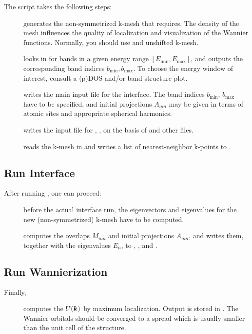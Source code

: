 The script \initwiiw takes the following steps:
%
\begin{description}
\item[] generates the non-symmetrized k-mesh that
  \wannier requires.  The density of the mesh influences the quality
  of localization and visualization of the Wannier functions.
  Normally, you should use and unshifted k-mesh.
\item[] looks in  for bands in a
  given energy range $[E_\text{min}, E_\text{max}]$, and outputs the
  corresponding band indices $b_\text{min}, b_\text{max}$.  To choose
  the energy window of interest, consult a (p)DOS and/or band
  structure plot.
\item[\writeinwf] writes the main input file  for the
  interface.  The band indices $b_\text{min}$, $b_\text{max}$ have to
  be specified, and initial projections $A_{mn}$ may be given in terms
  of atomic sites and appropriate spherical harmonics.
\item[\writewin] writes the input file for \wannierx, ,
  on the basis of  and other files.
\item[] reads the k-mesh in  and
  writes a list of nearest-neighbor k-points to .
\end{description}


\subsection{Run Interface}
After running \initwiiw, one can proceed:
\begin{description}
\item[] before the actual interface run, the
  eigenvectors and eigenvalues for the new (non-symmetrized) k-mesh
  have to be computed.
\item[] computes the overlaps $M_{mn}$ and initial
  projections $A_{mn}$, and writes them, together with the eigenvalues
  $E_n$, to , , and .
\end{description}


\subsection{Run Wannierization}
Finally,
\begin{description}
\item[] computes the $U(\boldsymbol k)$ by maximum
  localization.  Output is stored in . The Wannier
  orbitals should be converged to a spread which is usually smaller
  than the unit cell of the structure.
 \end{description}


